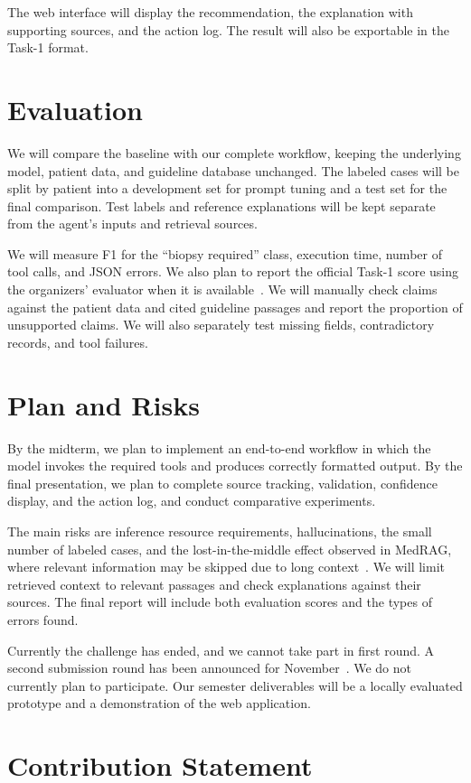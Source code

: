 \documentclass[english]{ucuproposal}
\begin{document}
The web interface will display the recommendation, the explanation with supporting sources, and the action log. The result will also be exportable in the Task-1 format.

\section{Evaluation}

We will compare the baseline with our complete workflow, keeping the underlying model, patient data, and guideline database unchanged. The labeled cases will be split by patient into a development set for prompt tuning and a test set for the final comparison. Test labels and reference explanations will be kept separate from the agent's inputs and retrieval sources.

We will measure F1 for the ``biopsy required'' class, execution time, number of tool calls, and JSON errors. We also plan to report the official Task-1 score using the organizers' evaluator when it is available~\cite{chimeraBaseline}. We will manually check claims against the patient data and cited guideline passages and report the proportion of unsupported claims. We will also separately test missing fields, contradictory records, and tool failures.

\section{Plan and Risks}

By the midterm, we plan to implement an end-to-end workflow in which the model invokes the required tools and produces correctly formatted output. By the final presentation, we plan to complete source tracking, validation, confidence display, and the action log, and conduct comparative experiments.

The main risks are inference resource requirements, hallucinations, the small number of labeled cases, and the lost-in-the-middle effect observed in MedRAG, where relevant information may be skipped due to long context~\cite{xiong2024medrag}. We will limit retrieved context to relevant passages and check explanations against their sources. The final report will include both evaluation scores and the types of errors found.

Currently the challenge has ended, and we cannot take part in first round.
A second submission round has been announced for November~\cite{chimeraRounds}. We do not currently plan to participate. Our semester deliverables will be a locally evaluated prototype and a demonstration of the web application.

\section{Contribution Statement}

\begin{contributions}
\end{contributions}

\clearpage
\ucuprintbibliography
\end{document}
